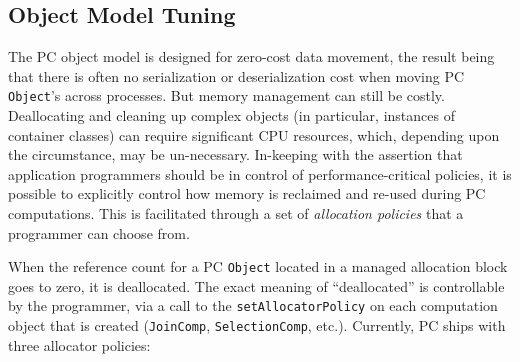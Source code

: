 \subsection{Object Model Tuning}
\label{sec:allocation}

\noindent
The PC object model is designed for zero-cost data movement, the result being that there is often no serialization or deserialization
cost
when moving PC \texttt{Object}'s across processes.  But memory management can still be costly.  Deallocating and cleaning
up complex objects (in particular, instances of container classes) can require significant CPU resources, which, depending upon the 
circumstance, may be un-necessary.  In-keeping with the assertion that application programmers should be in
control of performance-critical policies, it is possible to explicitly control how memory is reclaimed and re-used during PC computations.
This is facilitated through a set of \emph{allocation policies} that a programmer can choose from.

When the reference count for a PC \texttt{Object} located in a managed allocation block goes to zero, it is deallocated.  The exact
meaning of ``deallocated'' is controllable by the programmer, via a call to the \texttt{setAllocatorPolicy} on each computation object
that is created (\texttt{JoinComp}, \texttt{SelectionComp}, etc.).  Currently, PC ships with
three allocator policies:

